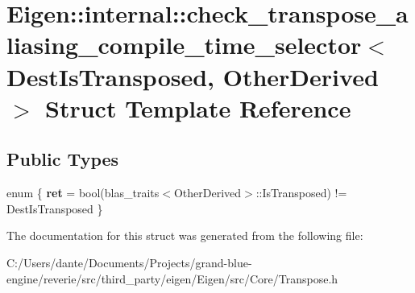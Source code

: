 \hypertarget{struct_eigen_1_1internal_1_1check__transpose__aliasing__compile__time__selector}{}\section{Eigen\+::internal\+::check\+\_\+transpose\+\_\+aliasing\+\_\+compile\+\_\+time\+\_\+selector$<$ Dest\+Is\+Transposed, Other\+Derived $>$ Struct Template Reference}
\label{struct_eigen_1_1internal_1_1check__transpose__aliasing__compile__time__selector}
\subsection*{Public Types}
\begin{DoxyCompactItemize}
\item 
\mbox{\label{struct_eigen_1_1internal_1_1check__transpose__aliasing__compile__time__selector_a80be3ee3ce41060f553d721a055779d5}} 
enum \{ {\bfseries ret} = bool(blas\+\_\+traits$<$Other\+Derived$>$\+::Is\+Transposed) != Dest\+Is\+Transposed
 \}
\end{DoxyCompactItemize}


The documentation for this struct was generated from the following file\+:\begin{DoxyCompactItemize}
\item 
C\+:/\+Users/dante/\+Documents/\+Projects/grand-\/blue-\/engine/reverie/src/third\+\_\+party/eigen/\+Eigen/src/\+Core/Transpose.\+h\end{DoxyCompactItemize}
